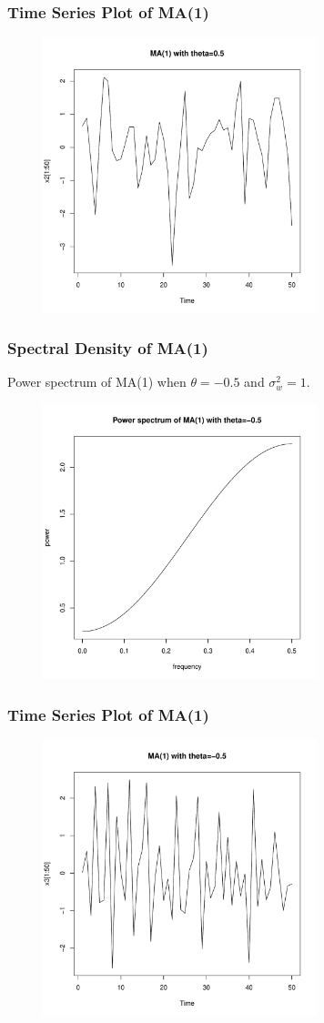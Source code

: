 \documentclass[%
xcolor=pdftex]{beamer}
\begin{document}
\begin{frame}
\frametitle{Time Series Plot of MA(1)}


\includegraphics[width=100mm, height=80mm]{ma1_1ts.pdf}


\end{frame}

\begin{frame}
\frametitle{Spectral Density of MA(1)}

Power spectrum of MA(1) when $\theta=-0.5$ and $\sigma_w^2=1$.

\includegraphics[width=100mm, height=80mm]{ma1_2power.pdf}

\end{frame}

\begin{frame}
\frametitle{Time Series Plot of MA(1)}


\includegraphics[width=100mm, height=80mm]{ma1_2ts.pdf}


\end{frame}
\end{document}
